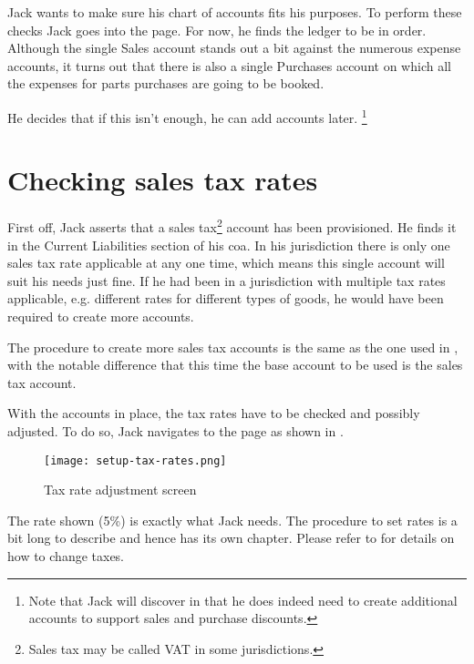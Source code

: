 Jack wants to make sure his chart of accounts fits his purposes. To perform these
checks Jack goes into the  page. For now, he finds
the ledger to be in order. Although the single Sales account stands out a bit against
the numerous expense accounts, it turns out that there is also a single Purchases
account on which all the expenses for parts purchases are going to be booked.

He decides that if this isn't enough, he can add accounts later.
\footnote{Note that Jack will discover in  that
he does indeed need to create additional accounts to support sales and
purchase discounts.}


\section{Checking sales tax rates}
\label{sec-first-login-checking-tax-rates}

First off, Jack asserts that a sales tax\footnote{Sales tax may be called \gls{VAT}
in some jurisdictions.} account has been provisioned. He finds it
in the Current Liabilities section of his \gls{coa}. In his jurisdiction there
is only one sales tax rate applicable at any one time, which means this single account
will suit his needs just fine. If he had been in a jurisdiction with multiple tax rates
applicable, e.g. different rates for different types of goods, he would have been
required to create more accounts.

The procedure to create more sales tax accounts is the same as the one used in
, with the notable difference that this time the base account
to be used is the sales tax account.

With the accounts in place, the tax rates have to be checked and possibly adjusted.
To do so, Jack navigates to the  page as shown in .

\begin{figure}[h]
\texttt{[image: setup-tax-rates.png]}
\caption{Tax rate adjustment screen}
\label{fig:setup-tax-rates}
\end{figure}

The rate shown (5\%) is exactly what Jack needs. The procedure to set rates is a bit
long to describe and hence has its own chapter. Please refer to  for
details on how to change taxes.

